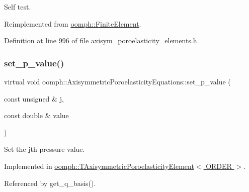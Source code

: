 Self test. 



Reimplemented from \hyperlink{classoomph_1_1FiniteElement_af94c5a5e22175d5420b33b3b79e46ed3}{oomph\+::\+Finite\+Element}.



Definition at line 996 of file axisym\+\_\+poroelasticity\+\_\+elements.\+h.

\mbox{\label{classoomph_1_1AxisymmetricPoroelasticityEquations_a9cd42073dd4fedcb98b578a1edbbb922}} 
\subsubsection{\texorpdfstring{set\+\_\+p\+\_\+value()}{set\_p\_value()}}
{\footnotesize\ttfamily virtual void oomph\+::\+Axisymmetric\+Poroelasticity\+Equations\+::set\+\_\+p\+\_\+value (\begin{DoxyParamCaption}\item[{const unsigned \&}]{j,  }\item[{const double \&}]{value }\end{DoxyParamCaption})\hspace{0.3cm}{\ttfamily [pure virtual]}}



Set the jth pressure value. 



Implemented in \hyperlink{classoomph_1_1TAxisymmetricPoroelasticityElement_a8156a72c0ba1887945532e528ff5173a}{oomph\+::\+T\+Axisymmetric\+Poroelasticity\+Element$<$ O\+R\+D\+E\+R $>$}.



Referenced by get\+\_\+q\+\_\+basis().

\mbox{\label{classoomph_1_1AxisymmetricPoroelasticityEquations_a40f0037981afc44e18425f472e04cb73}} 
